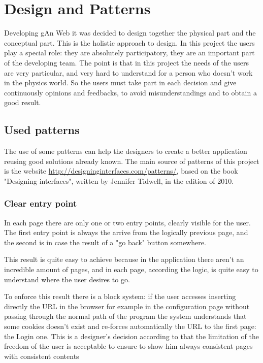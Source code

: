 
\chapter{Design and Patterns} %

\label{Chapter7} %

Developing gAn Web it was decided to design together the physical part and the conceptual part. This is the holistic approach to design. In this project the users play a special role: they are absolutely participatory, they are an important part of the developing team.
The point is that in this project the needs of the users are very particular, and very hard to understand for a person who doesn't work in the physics world. So the users must take part in each decision and give continuously opinions and feedbacks, to avoid misunderstandings and to obtain a good result.

\section{Used patterns}

The use of some patterns can help the designers to create a better application reusing good solutions already known.
The main source of patterns of this project is the website \url{http://designinginterfaces.com/patterns/}, based on the book "Designing interfaces", written by Jennifer Tidwell, in the edition of 2010.

\subsection{Clear entry point} 

In each page there are only one or two entry points, clearly visible for the user.
The first entry point is always the arrive from the logically previous page, and the second is in case the result of a "go back" button somewhere.

This result is quite easy to achieve because in the application there aren't an incredible amount of pages, and in each page, according the logic, is quite easy to understand where the user desires to go. 

To enforce this result there is a block system: if the user accesses inserting directly the URL in the browser for example in the configuration page without passing through the normal path of the program the system understands that some cookies doesn't exist and re-forces automatically the URL to the first page: the Login one. This is a designer's decision according to that the limitation of the freedom of the user is acceptable to ensure to show him always consistent pages with consistent contents

